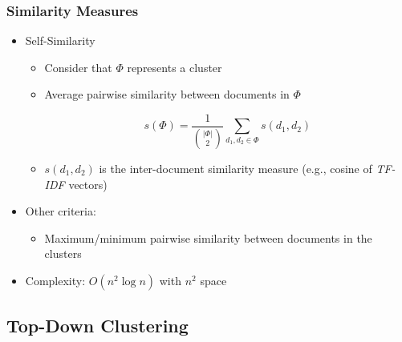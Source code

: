 \documentclass{beamer}
\begin{document}

\begin{frame}
  \frametitle{Similarity Measures}

  \begin{itemize}
  \item Self-Similarity
    \begin{itemize}
    \item Consider that $\Phi$ represents a cluster
    \item Average pairwise similarity between documents in $\Phi$
      \begin{block}{}
        \begin{displaymath}
          s(\Phi) =
          \frac{1}{\binom{|\Phi|}{2}}\sum_{d_1,d_2\in\Phi}s(d_1,d_2)
        \end{displaymath}
      \end{block}
    \item $s(d_1,d_2)$ is the inter-document similarity measure (e.g., cosine
      of \textit{TF-IDF} vectors)
    \end{itemize}
  \item Other criteria:
    \begin{itemize}
    \item Maximum/minimum pairwise similarity between documents in the
      clusters
    \end{itemize}
  \item Complexity: $O(n^2\log{n})$ with $n^2$ space
  \end{itemize}

\end{frame}


\subsection{Top-Down Clustering}
\end{document}
